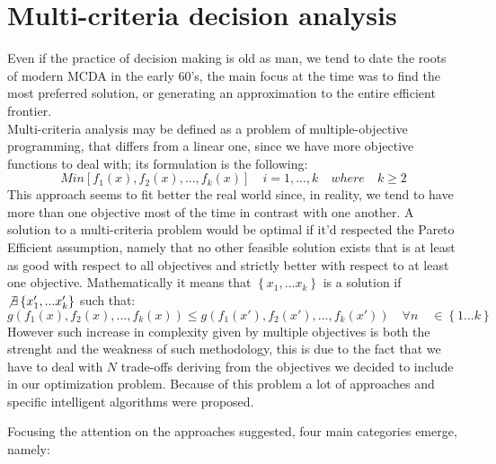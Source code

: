 \documentclass{article}
\begin{document}
\section{Multi-criteria decision analysis}
Even if the practice of decision making is old as man, we tend to date the roots of modern MCDA in the early 60's, the main focus at the time was to find the most preferred solution, or generating an approximation to the entire efficient frontier\cite{greco_multiple_2016}.
\\
Multi-criteria analysis may be defined as a problem of multiple-objective programming, that differs from a linear one,
since we have more objective functions to deal with; its formulation is the following:
	$$
	Min[f_1(x),f_2(x),...,f_k(x)] \quad i=1,...,k \quad where \quad k\geq2
	$$
This approach seems to fit better the real world since, in reality, we tend to have more than one objective most of the time in contrast with one another.
A solution to a multi-criteria problem would be optimal if it'd respected the Pareto Efficient assumption, namely that no other feasible solution exists that is at least as good with respect to all objectives and strictly better with respect to at least one objective. Mathematically it means that $\left\{x_1,...x_k\right\}$ is a solution if $\not\exists \left\{x'_1,...x'_k\right\}$
such that:
	\[
	g(f_1(x),f_2(x),...,f_k(x)) \leq g(f_1(x'),f_2(x'),...,f_k(x')) \quad \forall n \quad \in  \left\{1...k\right\}
	\]
However such increase in complexity given by multiple objectives is both the strenght and the weakness of such methodology, this is due to the fact that we have to deal with $N$ trade-offs deriving from the objectives we decided to include in our optimization problem. Because of this problem a lot of approaches and specific intelligent algorithms were proposed\cite{Cui2017}.

Focusing the attention on the approaches suggested, four main categories emerge, namely:
\end{document}
